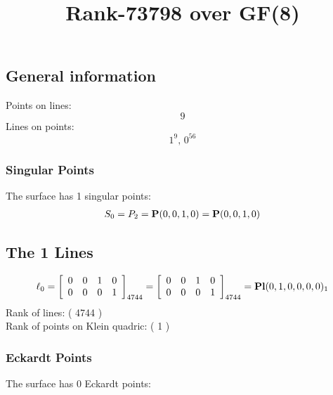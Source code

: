 \documentclass{article}
\newcommand\setTBstruts{\def\T{\rule{0pt}{2.6ex}}%
\def\B{\rule[-1.2ex]{0pt}{0pt}}}
\newcommand{\bP}{{\bf P}}
\begin{document}
 
\setTBstruts



{\allowdisplaybreaks%






\title{Rank-73798 over GF(8)}
\author{}%
\maketitle%
%
{}



\subsection*{General information}
Points on lines:
$$
9$$
Lines on points:
$$
1^9,\,0^{56}$$
\subsubsection*{Singular Points}
The surface has 1 singular points:\\
\begin{align*}
S_{0} &= P_{2}=\bP(0, 0, 1, 0) = \bP(0, 0, 1, 0)\\
\end{align*}
\subsection*{The 1 Lines}
$$
\ell_{0} = 
\left[
\begin{array}{*{4}{r}}
0 & 0 & 1 & 0\\
0 & 0 & 0 & 1\\
\end{array}
\right]
_{4744}
=
\left[
\begin{array}{*{4}c}
0  & 0  & 1  & 0\\
0  & 0  & 0  & 1\\
\end{array}
\right]_{4744}
={\rm\bf Pl}(0,1,0,0,0,0 )_{1}$$
Rank of lines: ( 4744 )\\
Rank of points on Klein quadric: ( 1 )\\
\subsubsection*{Eckardt Points}
The surface has 0 Eckardt points:\\
}
\end{document}
